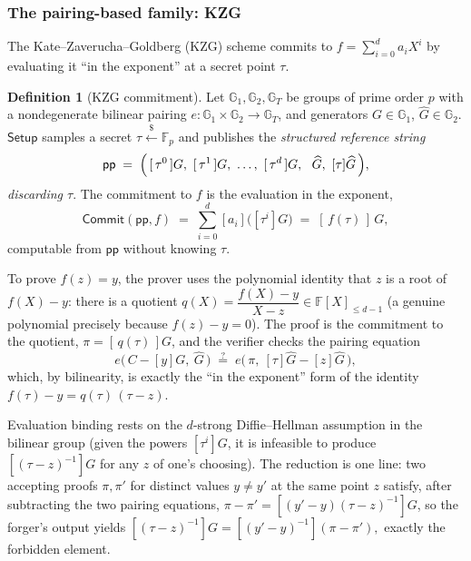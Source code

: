 \documentclass[11pt,a4paper]{article}
\theoremstyle{definition}
\newtheorem{definition}[theorem]{Definition}
\theoremstyle{remark}
\newcommand{\F}{\ensuremath{\mathbb{F}}}
\newcommand{\G}{\ensuremath{\mathbb{G}}}
\newcommand{\Fp}{\ensuremath{\mathbb{F}_{p}}}
\begin{document}
\subsubsection*{The pairing-based family: KZG}

The Kate--Zaverucha--Goldberg (KZG) scheme commits to \(f = \sum_{i=0}^d a_i X^i\) by evaluating it ``in the exponent'' at a secret point \(\tau\).

\begin{definition}[KZG commitment]\label{commitments:def:kzg}
Let \(\G_1, \G_2, \G_T\) be groups of prime order \(p\) with a nondegenerate bilinear pairing \(e \colon \G_1 \times \G_2 \to \G_T\), and generators \(G \in \G_1\), \(\widehat G \in \G_2\). \(\mathsf{Setup}\) samples a secret \(\tau \xleftarrow{\$} \Fp\) and publishes the \emph{structured reference string}
\[
  \mathsf{pp} \;=\; \Bigl(\, [\,\tau^0\,]G,\ [\,\tau^1\,]G,\ \dots,\ [\,\tau^d\,]G,\ \ \widehat G,\ [\tau]\widehat G \,\Bigr),
\]
\emph{discarding \(\tau\)}. The commitment to \(f\) is the evaluation in the exponent,
\[
  \mathsf{Commit}(\mathsf{pp}, f) \;=\; \sum_{i=0}^{d} [a_i]\bigl([\tau^i]G\bigr) \;=\; [\,f(\tau)\,]\,G,
\]
computable from \(\mathsf{pp}\) without knowing \(\tau\).
\end{definition}

To prove \(f(z) = y\), the prover uses the polynomial identity that \(z\) is a root of \(f(X) - y\): there is a quotient \(q(X) = \dfrac{f(X) - y}{X - z} \in \F[X]_{\le d-1}\) (a genuine polynomial precisely because \(f(z) - y = 0\)). The proof is the commitment to the quotient, \(\pi = [\,q(\tau)\,]G\), and the verifier checks the pairing equation
\[
  e\bigl(\, C - [y]G,\ \widehat G \,\bigr) \;\stackrel{?}{=}\; e\bigl(\, \pi,\ [\tau]\widehat G - [z]\widehat G \,\bigr),
\]
which, by bilinearity, is exactly the ``in the exponent'' form of the identity \(f(\tau) - y = q(\tau)\,(\tau - z)\).

Evaluation binding rests on the \(d\)-strong Diffie--Hellman assumption in the bilinear group (given the powers \([\tau^i]G\), it is infeasible to produce \([(\tau - z)^{-1}]G\) for any \(z\) of one's choosing). The reduction is one line: two accepting proofs \(\pi, \pi'\) for distinct values \(y \neq y'\) at the same point \(z\) satisfy, after subtracting the two pairing equations, \(\pi - \pi' = [(y' - y)(\tau - z)^{-1}]G\), so the forger's output yields
\(
  [(\tau - z)^{-1}]G = [(y' - y)^{-1}](\pi - \pi'),
\)
exactly the forbidden element.
\end{document}
